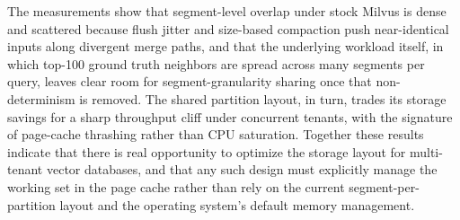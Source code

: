 The measurements show that segment-level overlap under stock
Milvus is dense and scattered because flush jitter and size-based
compaction push near-identical inputs along divergent merge paths,
and that the underlying workload itself, in which top-100 ground
truth neighbors are spread across many segments per query, leaves
clear room for segment-granularity sharing once that
non-determinism is removed. The shared partition layout, in turn,
trades its storage savings for a sharp throughput cliff under
concurrent tenants, with the signature of page-cache thrashing
rather than CPU saturation. Together these results indicate that
there is real opportunity to optimize the storage layout for
multi-tenant vector databases, and that any such design must
explicitly manage the working set in the page cache rather than
rely on the current segment-per-partition layout and the operating
system's default memory management.
